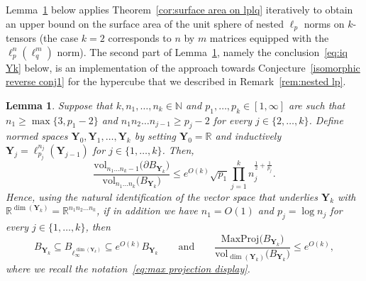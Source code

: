 \documentclass[11pt,reqno]{amsart}
\renewcommand{\le}{\leqslant}
\renewcommand{\ge}{\geqslant}
\renewcommand{\k}{\{1,\ldots,k\}}
\newcommand{\Y}{\mathbf Y}
\newcommand{\R}{\mathbb R}
\newtheorem{lemma}[theorem]{Lemma}
\theoremstyle{remark}
\renewcommand{\subset}{\subseteq}
\newcommand{\N}{\mathbb N}
\newcommand{\vol}{\mathrm{vol}}
\renewcommand{\1}{\mathbf 1}
\begin{document}
Lemma~\ref{lem:nested} below applies Theorem~\ref{cor:surface area on lplq} iteratively to obtain an upper bound on the surface area of the unit sphere of nested $\ell_p$ norms  on $k$-tensors  (the case $k=2$ corresponds to  $n$ by $m$ matrices equipped with the $\ell_p^n(\ell_q^m)$ norm). The second part of Lemma~\ref{lem:nested}, namely the conclusion~\eqref{eq:iq Yk} below, is an implementation of the approach towards Conjecture~\ref{isomorphic reverse conj1}   for the hypercube that we described in Remark~\ref{rem:nested lp}.
\begin{lemma}\label{lem:nested}Suppose that $k, n_1,\ldots,n_k\in \N$ and $p_1,\ldots,p_k\in [1,\infty]$ are such that $n_1\ge \max\{3,p_1-2\}$ and $n_1n_2\ldots n_{j-1}\ge p_j-2$ for every $j\in \{2,\ldots,k\}$.
Define normed spaces $\Y_0,\Y_1,\ldots,\Y_k$ by setting $\Y_0=\R$ and inductively  $\Y_{j}= \ell_{p_j}^{n_j}(\Y_{j-1})$ for $j\in \{1,\ldots,k\}$. Then,
\begin{equation}\label{eq:ratio for nested ellp}
\frac{\vol_{n_1\ldots n_k-1}\big(\partial B_{\Y_k}\big)}{\vol_{n_1\ldots n_k}\big(B_{\Y_k}\big)}\le e^{O(k)}\sqrt{p_1}\prod_{j=1}^k n_j^{\frac12+\frac{1}{p_j}}.
\end{equation}
Hence, using the natural identification of the vector space that underlies $\Y_k$ with $\R^{\dim(\Y_k)}=\R^{n_1n_2\ldots n_k}$, if in addition we have $n_1=O(1)$ and $p_j=\log n_j$ for every $j\in \k$, then
\begin{equation}\label{eq:iq Yk}
B_{\Y_k}\subset B_{\ell_\infty^{\dim(\Y_k)}}\subset e^{O(k)} B_{\Y_k}
\qquad \mathrm{and}\qquad \frac{\mathrm{MaxProj}\big(B_{\Y_k}\big)}{\vol_{\dim(\Y_k)}\big(B_{\Y_k}\big)}\le e^{O(k)},
\end{equation}
where we recall the notation~\eqref{eq:max projection display}.
\end{lemma}
\end{document}
